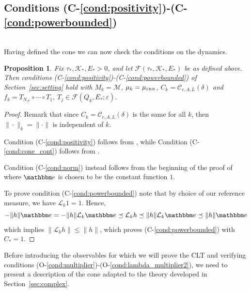 \documentclass{amsart}
\numberwithin{equation}{section}
\newtheorem{prop}[thm]{Proposition}
\newcommand\cC{{\mathcal C}}
\newcommand\cF{{\mathcal F}}
\newcommand\cK{{\mathcal K}}
\newcommand\cL{{\mathcal L}}
\newcommand\cM{{\mathcal M}}
\newcommand\ve{\varepsilon}
\newcommand{\bbe}{\mathbbm e}
\newcommand{\musrb}{\mu_{\mbox{\tiny SRB}}}
\begin{document}
\subsection{Conditions (C-\ref{cond:positivity})-(C-\ref{cond:powerbounded})}
\label{sec:condC_bill}\ \\
Having defined the cone we can now check the conditions on the dynamics.
\begin{prop}
\label{prop:C-check}
Fix $\tau_*, \cK_*, E_*>0$, and let $\cF(\tau_*, \cK_*, E_*)$ be as defined above.  Then
conditions (C-\ref{cond:positivity})-(C-\ref{cond:powerbounded}) of Section~\ref{sec:setting} hold
with $M_k = \cM$, $\mu_k = \musrb$, $C_k = \cC_{c,A,L}(\delta)$
and $f_k = T_{N_\cF} \circ \cdots \circ T_1$,  $T_j \in \cF(Q_k, E_*; \ve)$.
\end{prop}

\begin{proof}
Remark that since $C_k = \cC_{c,A,L}(\delta)$ is the same for all $k$, then $\|\cdot\|_k=\|\cdot\|$ is independent of $k$.

Condition (C-\ref{cond:positivity}) follows from \cite[Remark 7.2]{DL22}, while Condition (C-\ref{cond:cone_cont}) follows from \cite[Theorems 6.12 and 6.13]{DL22}. 

Condition (C-\ref{cond:norm}) instead follows from the beginning of the proof of \cite[Lemma 8.15]{DL22} where $\bbe$ is chosen to be the constant function $1$.

To prove condition (C-\ref{cond:powerbounded}) note that by choice of our reference measure, we have $\cL_k1=1$. Hence, 
\[
-\|h\|\bbe=-\|h\|\cL_k \bbe\preceq \cL_k h \preceq \|h \| \cL_k \bbe \preceq \|h\|\bbe
\]
which implies $\|\cL_k h\|\leq \|h\|$, which proves (C-\ref{cond:powerbounded}) with $C_*=1$.
\end{proof}
Before introducing the observables for which we will prove the CLT and verifying conditions 
(O-\ref{cond:multiplier})-(O-\ref{cond:lambda_multiplier2}), we need to present a description of the cone adapted to the theory developed in Section~\ref{sec:complex}.
\end{document}
